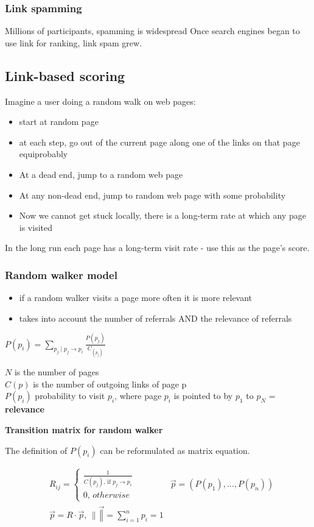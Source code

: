 \subsubsection{Link spamming}
Millions of participants, spamming is widespread
Once search engines began to use link for ranking, link spam grew.

\subsection{Link-based scoring}
Imagine a user doing a random walk on web pages:
\begin{itemize}
\item start at random page
\item at each step, go out of the current page along one of the
  links on that page equiprobably
\item At a dead end, jump to a random web page
\item At any non-dead end, jump to random web page with some
  probability
\item Now we cannot get stuck locally, there is a long-term rate at
  which any page is visited
\end{itemize}
In the long run each page has a long-term visit rate - use this as the
page's score.

\subsubsection{Random walker model}
\begin{itemize}
\item if a random walker visits a page more often it is more relevant
\item takes into account the number of referrals AND the relevance of
  referrals
\end{itemize}

$ P(p_i) = \sum_{p_j \mid p_j \rightarrow p_i} \frac{P(p_j)}{C_(p_j)}
$

$ N $ is the number of pages \\
$ C(p) $ is the number of outgoing links of page p \\
$ P(p_i) $ probability to visit $ p_i $, where page $ p_i $ is pointed to by
$ p_1 $ to $ p_N $ = \textbf{relevance}

\textbf{Transition matrix for random walker}

The definition of $ P(p_i) $ can be reformulated as matrix equation.

\begin{align*}
  & R_{ij} = \begin{cases}
    \frac{1}{C(p_j), \, \text{if } p_j \rightarrow p_i} \\
    0, \, otherwise
  \end{cases}
  & \vec{p} = (P(p_1), \ldots, P(p_n)) \\
  & \vec{p} = R \cdot \vec{p}, \, \| \vec \| = \sum_{i=1}^{n} p_i = 1
\end{align*}

